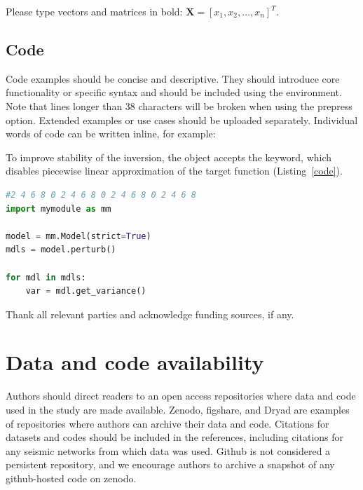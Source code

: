 \documentclass[breakmath]{seismica}
\begin{document}
	Please type vectors and matrices in bold: $\mathbf{X} = \left[x_1,x_2,\ldots,x_n \right]^T$.

	\subsection{Code}

    Code examples should be concise and descriptive. They should introduce core functionality or specific syntax and should be included using the  environment. Note that lines longer than 38 characters will be broken when using the prepress option. Extended examples or use cases should be uploaded separately. Individual words of code can be written inline, for example:

        To improve stability of the inversion, the  object accepts the  keyword, which disables piecewise linear approximation of the target function (Listing~\ref{code}).

        \begin{lstlisting}[caption=Example use of \code{Model}, label=code, language=Python]
#2 4 6 8 0 2 4 6 8 0 2 4 6 8 0 2 4 6 8
import mymodule as mm

model = mm.Model(strict=True)
mdls = model.perturb()

for mdl in mdls:
    var = mdl.get_variance()
\end{lstlisting}
	
	\begin{acknowledgements}
		Thank all relevant parties and acknowledge funding sources, if any.
	\end{acknowledgements}
	
	\section*{Data and code availability}
	Authors should direct readers to an open access repositories where data and code used in the study are made available. Zenodo, figshare, and Dryad are examples of repositories where authors can archive their data and code. Citations for datasets and codes should be included in the references, including citations for any seismic networks from which data was used. Github is not considered a persistent repository, and we encourage authors to archive a snapshot of any github-hosted code on zenodo.
	
	
	
\end{document}
